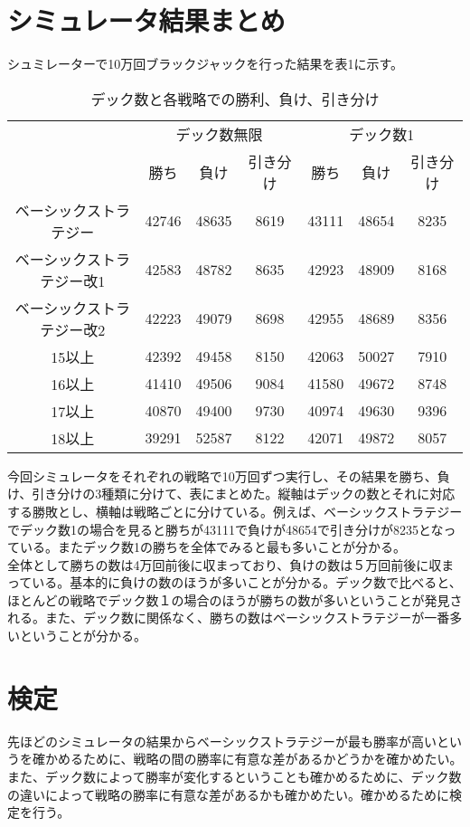 \section{シミュレータ結果まとめ}
シュミレーターで10万回ブラックジャックを行った結果を表1に示す。
\begin{table}[H]
 \begin{center}
  \begin{tabular}{|c|c|c|c|c|c|c|}
    \hline
     & \multicolumn{3}{c|}{デック数無限} & \multicolumn{3}{c|}{デック数1} \\
    \cline{2-7} & 勝ち & 負け & 引き分け & 勝ち & 負け & 引き分け \\
    \hline ベーシックストラテジー & 42746 & 48635 & 8619 & 43111 & 48654 & 8235 \\
    \hline ベーシックストラテジー改1 & 42583 & 48782 & 8635 & 42923 & 48909 & 8168 \\
    \hline ベーシックストラテジー改2 & 42223 & 49079 & 8698 & 42955 & 48689 & 8356 \\
    \hline 15以上 & 42392 & 49458 & 8150 & 42063 & 50027 & 7910 \\
    \hline 16以上 & 41410 & 49506 & 9084 & 41580 & 49672 & 8748 \\
    \hline 17以上 & 40870 & 49400 & 9730 & 40974 & 49630 & 9396 \\
    \hline 18以上 & 39291 & 52587 & 8122 & 42071 & 49872 & 8057 \\
    \hline
  \end{tabular}
 \end{center}
 \caption{デック数と各戦略での勝利、負け、引き分け}
\end{table}
今回シミュレータをそれぞれの戦略で10万回ずつ実行し、その結果を勝ち、負け、引き分けの3種類に分けて、表にまとめた。縦軸はデックの数とそれに対応する勝敗とし、横軸は戦略ごとに分けている。例えば、ベーシックストラテジーでデック数1の場合を見ると勝ちが43111で負けが48654で引き分けが8235となっている。またデック数1の勝ちを全体でみると最も多いことが分かる。\\
全体として勝ちの数は4万回前後に収まっており、負けの数は５万回前後に収まっている。基本的に負けの数のほうが多いことが分かる。デック数で比べると、ほとんどの戦略でデック数１の場合のほうが勝ちの数が多いということが発見される。また、デック数に関係なく、勝ちの数はベーシックストラテジーが一番多いということが分かる。

\section{検定}
先ほどのシミュレータの結果からベーシックストラテジーが最も勝率が高いというを確かめるために、戦略の間の勝率に有意な差があるかどうかを確かめたい。また、デック数によって勝率が変化するということも確かめるために、デック数の違いによって戦略の勝率に有意な差があるかも確かめたい。確かめるために検定を行う。
